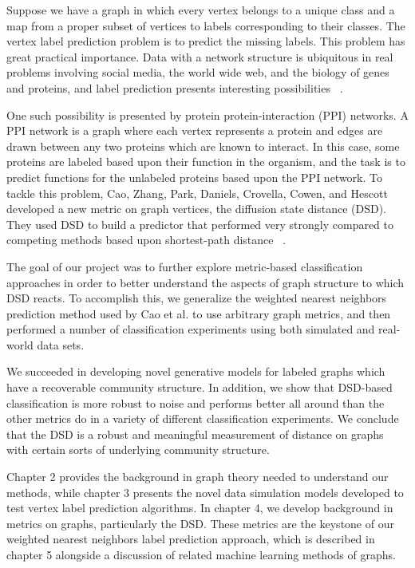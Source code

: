 Suppose we have a graph in which every vertex belongs to a unique class and a map from a proper
subset of vertices to labels corresponding to their classes. The vertex label prediction problem is
to predict the missing labels. This problem has great practical importance. Data with a network
structure is ubiquitous in real problems involving social media, the world wide web, and the biology
of genes and proteins, and label prediction presents interesting possibilities ~\cite{FRASCA201384}.

One such possibility is presented by protein protein-interaction (PPI) networks. A PPI network is a
graph where each vertex represents a protein and edges are drawn between any two proteins which are
known to interact. In this case, some proteins are labeled based upon their function in the
organism, and the task is to predict functions for the unlabeled proteins based upon the PPI
network.
To tackle this problem, Cao, Zhang, Park, Daniels, Crovella, Cowen, and Hescott developed a new
metric on graph vertices, the diffusion state distance (DSD). They used DSD to build a predictor
that performed very strongly compared to competing methods based upon shortest-path distance
~\cite{10.1371/journal.pone.0076339}. %



The goal of our project was to further explore metric-based classification approaches in order to
better understand the aspects of graph structure to which DSD reacts. To accomplish this, we
generalize the weighted nearest neighbors prediction method used by Cao et al. to use arbitrary
graph metrics, and then performed a number of classification experiments using both simulated and
real-world data sets.

We succeeded in developing novel generative models for labeled graphs which have a recoverable
community structure. In addition, we show that DSD-based classification is more robust to noise and
performs better all around than the other metrics do in a variety of different classification
experiments. We conclude that the DSD is a robust and meaningful measurement of distance on graphs
with certain sorts of underlying community structure.

Chapter 2 provides the background in graph theory needed to understand our methods, while chapter 3
presents the novel data simulation models developed to test vertex label prediction algorithms. In
chapter 4, we develop background in metrics on graphs, particularly the DSD. These metrics are the
keystone of our weighted nearest neighbors label prediction approach, which is described in chapter
5 alongside a discussion of related machine learning methods of graphs.

